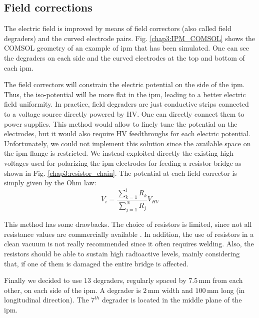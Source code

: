 \begin{refsection}
  \subsection{Field corrections}
  \label{chap3:field_corrections}
  
  The electric field is improved by means of field correctors (also called field degraders) and the curved electrode pairs. Fig. \ref{chap3:IPM_COMSOL} shows the COMSOL geometry of an example of \acrshort{ipm} that has been simulated. One can see the degraders on each side and the curved electrodes at the top and bottom of each \acrshort{ipm}.

  The field correctors will constrain the electric potential on the side of the \acrshort{ipm}. Thus, the iso-potential will be more flat in the \acrshort{ipm}, leading to a better electric field uniformity. In practice, field degraders are just conductive strips connected to a voltage
  source directly powered by HV. One can directly connect them to power supplies. This method would allow to finely tune the potential on the electrodes, but it would also require HV feedthroughs for each electric potential. Unfortunately, we could not implement this solution since the available space on the \acrshort{ipm} flange is restricted. We instead exploited directly the existing high voltages used for polarizing the \acrshort{ipm} electrodes for feeding a resistor bridge as shown in Fig. \ref{chap3:resistor_chain}. The potential at each field corrector is simply given by the Ohm law:
  \begin{equation}
    V_{i} = \frac{\sum_{k = 1}^{i} R_{k}}{\sum_{j = 1}^{N} R_{j}}V_{HV} \label{chap3:PontDiviseur}
  \end{equation}

  

  This method has some drawbacks. The choice of resistors is limited, since not all resistance values are commercially available \cite{Vishay2012}. In addition, the use of resistors in a clean vacuum is not really recommended since it often requires welding. Also, the resistors should be able to sustain high radioactive levels, mainly considering that, if one of them is damaged the entire bridge is affected.

  Finally we decided to use $13$ degraders, regularly spaced by $7.5\,\mathrm{mm}$ from each other, on each side of the \acrshort{ipm}. A degrader is $2\,\mathrm{mm}$ width and $100\,\mathrm{mm}$ long (in longitudinal direction). The $7^{th}$ degrader is located in the middle plane of the \acrshort{ipm}.


\end{refsection}
